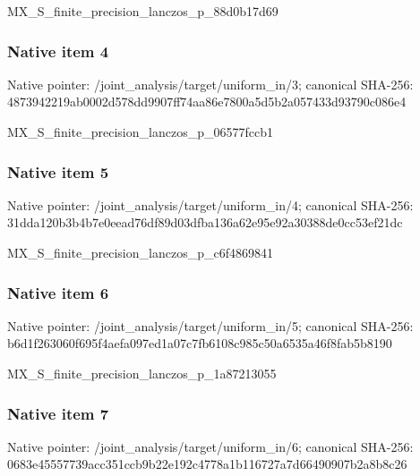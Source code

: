 \documentclass[10pt,a4paper]{article}
\begin{document}
\begingroup\raggedright\sloppy MX\_\allowbreak{}S\_\allowbreak{}finite\_\allowbreak{}precision\_\allowbreak{}lanczos\_\allowbreak{}p\_\allowbreak{}88d0b17d69\par\endgroup

\subsubsection{Native item 4}
Native pointer: /joint\_\allowbreak{}analysis/target/uniform\_\allowbreak{}in/3; canonical SHA-256: 4873942219ab0002d578dd9907ff74aa86e7800a5d5b2a057433d93790c086e4

\begingroup\raggedright\sloppy MX\_\allowbreak{}S\_\allowbreak{}finite\_\allowbreak{}precision\_\allowbreak{}lanczos\_\allowbreak{}p\_\allowbreak{}06577fccb1\par\endgroup

\subsubsection{Native item 5}
Native pointer: /joint\_\allowbreak{}analysis/target/uniform\_\allowbreak{}in/4; canonical SHA-256: 31dda120b3b4b7e0eead76df89d03dfba136a62e95e92a30388de0cc53ef21dc

\begingroup\raggedright\sloppy MX\_\allowbreak{}S\_\allowbreak{}finite\_\allowbreak{}precision\_\allowbreak{}lanczos\_\allowbreak{}p\_\allowbreak{}c6f4869841\par\endgroup

\subsubsection{Native item 6}
Native pointer: /joint\_\allowbreak{}analysis/target/uniform\_\allowbreak{}in/5; canonical SHA-256: b6d1f263060f695f4aefa097ed1a07c7fb6108c985c50a6535a46f8fab5b8190

\begingroup\raggedright\sloppy MX\_\allowbreak{}S\_\allowbreak{}finite\_\allowbreak{}precision\_\allowbreak{}lanczos\_\allowbreak{}p\_\allowbreak{}1a87213055\par\endgroup

\subsubsection{Native item 7}
Native pointer: /joint\_\allowbreak{}analysis/target/uniform\_\allowbreak{}in/6; canonical SHA-256: 0683e45557739acc351ccb9b22e192c4778a1b116727a7d66490907b2a8b8c26
\end{document}
